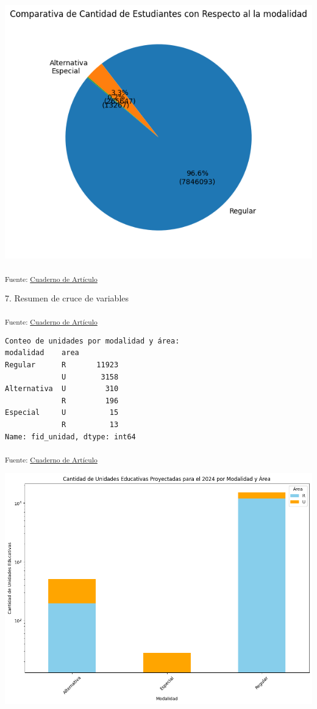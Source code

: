 \documentclass[
  12pt]{article}
\begin{document}
\includegraphics{index_files/figure-pdf/cell-31-output-1.png}

\textsubscript{Fuente:
\href{https://sociest.github.io/ue-report/index.ipynb.html}{Cuaderno de
Artículo}}

7. Resumen de cruce de variables

\textsubscript{Fuente:
\href{https://sociest.github.io/ue-report/index.ipynb.html}{Cuaderno de
Artículo}}

\begin{verbatim}
Conteo de unidades por modalidad y área:
modalidad    area
Regular      R       11923
             U        3158
Alternativa  U         310
             R         196
Especial     U          15
             R          13
Name: fid_unidad, dtype: int64
\end{verbatim}

\textsubscript{Fuente:
\href{https://sociest.github.io/ue-report/index.ipynb.html}{Cuaderno de
Artículo}}

\includegraphics{index_files/figure-pdf/cell-33-output-1.png}
\end{document}
